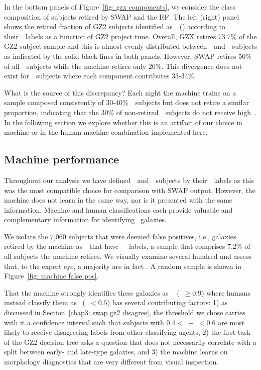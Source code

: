 In the bottom panels of Figure~\ref{fig: gzx components}, we consider the class
composition of subjects retired by SWAP and the RF. The left (right) panel shows the retired fraction of GZ2 subjects identified as~\feat~(\notfeat) according to their~\raw~labels as a function of GZ2 project time. Overall, GZX retires 73.7\% of the GZ2 subject sample and this is almost evenly distributed between~\feat~and~\notfeat~subjects as indicated by the solid black lines in both panels. However, SWAP retires 50\% of all~\feat~subjects while the machine retires only 20\%. This divergence does not exist for~\notfeat~subjects where each component contributes 33-34\%. 

What is the source of this discrepancy? Each night the machine trains on a sample composed consistently of 30-40\%~\feat~subjects but does not retire a similar proportion, indicating that the 30\% of non-retired~\feat~subjects do not receive high~\pmachine. In the following section we explore whether this is an artifact of our choice in machine or in the human-machine combination implemented here. 


\subsection{Machine performance}\label{chap4: machine performance}

Throughout our analysis we have defined~\feat~and~\notfeat~subjects by 
their~\raw~labels as this was the most compatible choice for comparison with SWAP output. However, the machine does not learn in the same way, nor is it presented with the same information. Machine and human classifications each provide valuable and complementary information for identifying \feat~galaxies.

We isolate the 7,060 subjects that were deemed false positives, i.e., galaxies 
retired by the machine as~\feat~that have~\notfeat~\raw~labels, a sample that
comprises 7.2\% of all subjects the machine retires. We visually examine several hundred and assess that, to the expert eye, a majority are in fact \feat. A random sample is shown in Figure~\ref{fig: machine false pos}. 


That the machine strongly identifies these galaxies as \feat~
(\pmachine~$\ge 0.9$) where humans instead classify them as \notfeat~(\ffeat~$< 0.5$) has several contributing factors: 1) as discussed in Section~\ref{chap3: swap gz2 disagree}, the threshold we chose carries with it a confidence interval such that subjects with $0.4 <$~\ffeat+\fstar~$< 0.6$ are most likely to receive disagreeing labels from other classifying agents, 2) the first task of the GZ2 decision tree asks a question that does not necessarily correlate with a split between early- and
 late-type galaxies, and 3) the machine learns on morphology diagnostics
 that are very different from visual inspection.

